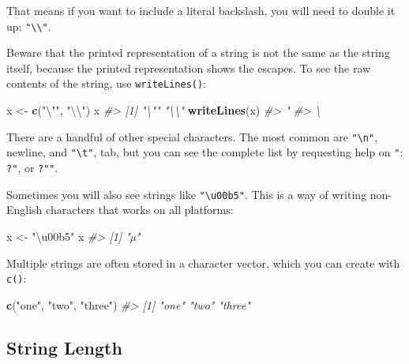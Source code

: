 \documentclass[
]{book}
\newenvironment{Shaded}{\begin{snugshade}}{\end{snugshade}}
\newcommand{\CharTok}[1]{\textcolor[rgb]{0.31,0.60,0.02}{#1}}
\newcommand{\CommentTok}[1]{\textcolor[rgb]{0.56,0.35,0.01}{\textit{#1}}}
\newcommand{\KeywordTok}[1]{\textcolor[rgb]{0.13,0.29,0.53}{\textbf{#1}}}
\newcommand{\NormalTok}[1]{#1}
\newcommand{\StringTok}[1]{\textcolor[rgb]{0.31,0.60,0.02}{#1}}
\begin{document}
That means if you want to include a literal backslash, you will need to double it up: \texttt{"\textbackslash{}\textbackslash{}"}.

Beware that the printed representation of a string is not the same as the string itself, because the printed representation shows the escapes. To see the raw contents of the string, use \texttt{writeLines()}:

\begin{Shaded}
\begin{Highlighting}[]
\NormalTok{x <-}\StringTok{ }\KeywordTok{c}\NormalTok{(}\StringTok{"}\CharTok{\textbackslash{}"}\StringTok{"}\NormalTok{, }\StringTok{"}\CharTok{\textbackslash{}\textbackslash{}}\StringTok{"}\NormalTok{)}
\NormalTok{x}
\CommentTok{#> [1] "\textbackslash{}"" "\textbackslash{}\textbackslash{}"}
\KeywordTok{writeLines}\NormalTok{(x)}
\CommentTok{#> "}
\CommentTok{#> \textbackslash{}}
\end{Highlighting}
\end{Shaded}

There are a handful of other special characters. The most common are \texttt{"\textbackslash{}n"}, newline, and \texttt{"\textbackslash{}t"}, tab, but you can see the complete list by requesting help on \texttt{"}: \texttt{?\textquotesingle{}"\textquotesingle{}}, or \texttt{?"\textquotesingle{}"}.

Sometimes you will also see strings like \texttt{"\textbackslash{}u00b5"}. This is a way of writing non-English characters that works on all platforms:

\begin{Shaded}
\begin{Highlighting}[]
\NormalTok{x <-}\StringTok{ "\textbackslash{}u00b5"}
\NormalTok{x}
\CommentTok{#> [1] "µ"}
\end{Highlighting}
\end{Shaded}

Multiple strings are often stored in a character vector, which you can create with \texttt{c()}:

\begin{Shaded}
\begin{Highlighting}[]
\KeywordTok{c}\NormalTok{(}\StringTok{"one"}\NormalTok{, }\StringTok{"two"}\NormalTok{, }\StringTok{"three"}\NormalTok{)}
\CommentTok{#> [1] "one"   "two"   "three"}
\end{Highlighting}
\end{Shaded}

\hypertarget{string-length}{%
\subsection{String Length}\label{string-length}}
\end{document}
